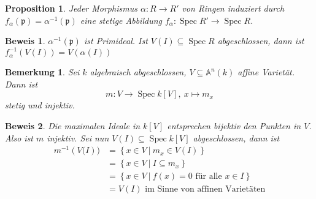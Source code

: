 \documentclass[a4paper,oneside]{scrbook}
\theoremstyle{break}
\newtheorem{Bem}[Def]{Bemerkung}
\newtheorem{Prop}[Def]{Proposition}
\theoremstyle{nonumberbreak}
\theoremstyle{nonumberplain}
\newtheorem{Bew}{Beweis}
\theoremstyle{break}
\newcommand{\Spec}{%
	\ensuremath{\operatorname{Spec}}%
}
\begin{document}
\begin{Prop}
	Jeder Morphismus $\alpha\colon R \to R'$ von Ringen induziert durch $f_{ \alpha} \left(\mathfrak{p} \right) = \alpha^{-1}( \mathfrak{p} )$
	eine stetige Abbildung $f_{\alpha}\colon \Spec R' \to \Spec R$.
\end{Prop}
\begin{Bew}
	$\alpha^{-1}\left( \mathfrak{p} \right)$ ist Primideal. Ist $V(I) \subseteq \Spec R$ abgeschlossen, dann ist
	$f_{\alpha}^{-1}\left( V\left(I\right) \right) = V\left( \alpha\left( I \right) \right)$
\end{Bew}



\begin{Bem}
	Sei $k$ algebraisch abgeschlossen, $V \subseteq \mathbb{A}^{n}\left(k\right)$ affine Varietät.
	Dann ist 
	\[ m\colon V \to \Spec k[V],\ x \mapsto m_x \] 
	stetig und injektiv.
\end{Bem}
\begin{Bew}
	Die maximalen Ideale in $k[V]$ entsprechen bijektiv den Punkten in $V$. Also ist $m$ injektiv.
	Sei nun $V\left(I\right) \subseteq \Spec k[V]$ abgeschlossen, dann ist
	\begin{align*}
		m^{-1}\left( V(I\right)) &= \left\{ x \in V\ |\ m_x \in V\left(I\right) \right\}	\\
					&= \left\{ x \in V\ |\ I \subseteq m_x \right\} \\
					&= \left\{ x \in V\ |\ f\left(x\right) = 0 \text{ für alle } x\in I \right\} \\
					&= V\left(I\right) \text{ im Sinne von affinen Varietäten}
	\end{align*}
\end{Bew}
\end{document}
